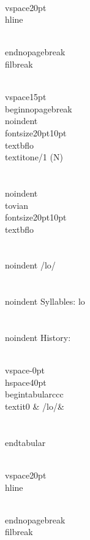 \\vspace{20pt}\\hline

\\end{nopagebreak}
\\filbreak



\\vspace{15pt}
\\begin{nopagebreak}
\\noindent{\\fontsize{20pt}{10pt}\\textbf{lo} } \\textit{one/1} (N)\\\\
\\noindent {\\tovian \\fontsize{20pt}{10pt} \\textbf{lo} }\\\\
\\noindent /l{\textprimstress}o/\\\\
\\noindent Syllables: lo\\\\


\\noindent History:

\\vspace{-0pt}
\\hspace{40pt}
\\begin{tabular}{ccc}
\\textit{0} & /lo/& \\\\
\\end{tabular}

\\vspace{20pt}\\hline

\\end{nopagebreak}
\\filbreak



